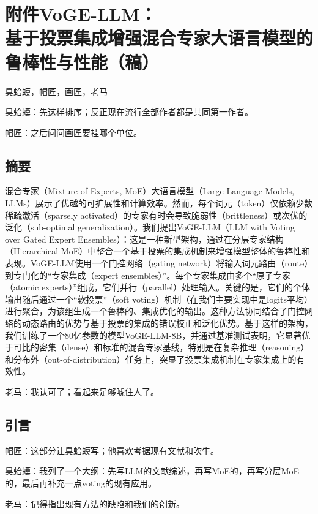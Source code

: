 \chapter*{附件\fullspace VoGE-LLM：\\基于投票集成增强混合专家大语言模型的鲁棒性与性能（稿）}

\begin{center}臭蛤蟆，帽匠，画匠，老马\end{center}

{\kaiti 臭蛤蟆：先这样排序；反正现在流行全部作者都是共同第一作者。}

{\kaiti 帽匠：之后问问画匠要挂哪个单位。}

\section*{摘要}
\begingroup\small%
混合专家（Mixture-of-Experts, MoE）大语言模型（Large Language Models, LLMs）展示了优越的可扩展性和计算效率。然而，每个词元（token）仅依赖少数稀疏激活（sparsely activated）的专家有时会导致脆弱性（brittleness）或次优的泛化（sub-optimal generalization）。我们提出VoGE-LLM（LLM with Voting over Gated Expert Ensembles）：这是一种新型架构，通过在分层专家结构（Hierarchical MoE）中整合一个基于投票的集成机制来增强模型整体的鲁棒性和表现。VoGE-LLM使用一个门控网络（gating network）将输入词元路由（route）到专门化的“专家集成（expert ensembles）”。每个专家集成由多个“原子专家（atomic experts）”组成，它们并行（parallel）处理输入。关键的是，它们的个体输出随后通过一个“软投票”（soft voting）机制（在我们主要实现中是logits平均）进行聚合，为该组生成一个鲁棒的、集成优化的输出。这种方法协同结合了门控网络的动态路由的优势与基于投票的集成的错误校正和泛化优势。基于这样的架构，我们训练了一个80亿参数的模型VoGE-LLM-8B，并通过基准测试表明，它显著优于可比的密集（dense）和标准的混合专家基线，特别是在复杂推理（reasoning）和分布外（out-of-distribution）任务上，突显了投票集成机制在专家集成上的有效性。
\endgroup

{\kaiti 老马：我认可了；看起来足够唬住人了。}

\section{引言}
{\kaiti 帽匠：这部分让臭蛤蟆写；他喜欢考据现有文献和吹牛。}

{\kaiti 臭蛤蟆：我列了一个大纲：先写LLM的文献综述，再写MoE的，再写分层MoE的，最后再补充一点voting的现有应用。}

{\kaiti 老马：记得指出现有方法的缺陷和我们的创新。}

